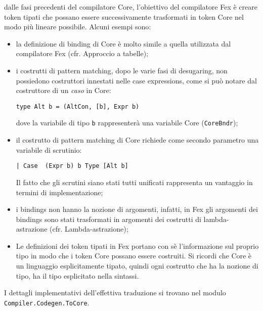 \documentclass[10pt,a4paper]{article}
\begin{document}
dalle fasi precedenti del compilatore Core, l'obiettivo del compilatore Fex è creare token tipati che possano essere
successivamente trasformati in token Core nel modo più lineare possibile. Alcuni esempi sono:
\begin{itemize}
    \item la definizione di binding di Core è molto simile a quella utilizzata dal compilatore Fex (cfr.
    Approccio a tabelle);
    \item i costrutti di pattern matching, dopo le varie fasi di desugaring, non possiedono costruttori innestati nelle
    case expressions, come si può notare dal costruttore di un \textit{caso} in Core:
    \begin{lstlisting}
type Alt b = (AltCon, [b], Expr b)
    \end{lstlisting}
    dove la variabile di tipo \texttt{b} rappresenterà una variabile Core (\texttt{CoreBndr});
    \item il costrutto di pattern matching di Core richiede come secondo parametro una variabile di scrutinio:
    \begin{lstlisting}
| Case  (Expr b) b Type [Alt b]
    \end{lstlisting}
    Il fatto che gli scrutini siano stati tutti unificati rappresenta un vantaggio in termini di implementazione;
    \item i bindings non hanno la nozione di argomenti, infatti, in Fex gli argomenti dei bindings sono stati
    trasformati in argomenti dei costrutti di lambda-astrazione (cfr. Lambda-astrazione);
    \item Le definizioni dei token tipati in Fex portano con sè l'informazione sul proprio tipo in modo che i token
    Core possano essere costruiti. Si ricordi che Core è un linguaggio esplicitamente tipato, quindi ogni costrutto che
    ha la nozione di tipo, ha il tipo esplicitato nella sintassi.
\end{itemize}
I dettagli implementativi dell'effettiva traduzione si trovano nel modulo \texttt{Compiler.Codegen.ToCore}.
\end{document}
